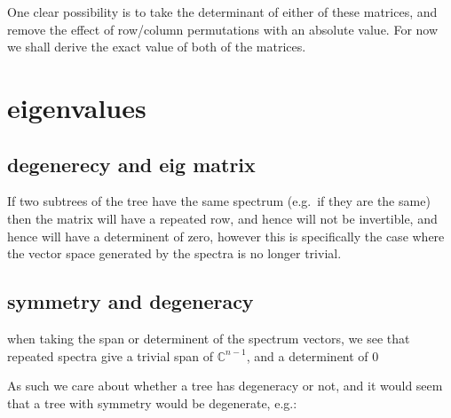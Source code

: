 \documentclass{report}
\begin{document}
One clear possibility is to take the determinant of either of these matrices,
and remove the effect of row/column permutations with an absolute value.
For now we shall derive the exact value of both of the matrices.


\section{eigenvalues}

%
%
%
%


\subsection{degenerecy and eig matrix}

If two subtrees of the tree have the same spectrum (e.g.\ if they are the same)
then the matrix will have a repeated row, and hence will not be invertible, and
hence will have a determinent of zero, however this is specifically the case
where the vector space generated by the spectra is no longer trivial.

\subsection{symmetry and degeneracy}

when taking the span or determinent of the spectrum vectors, we see that
repeated spectra give a trivial span of $\mathds{C}^{n-1}$, and a determinent of 0

As such we care about whether a tree has degeneracy or not, and it would seem
that a tree with symmetry would be degenerate, e.g.:
\end{document}

